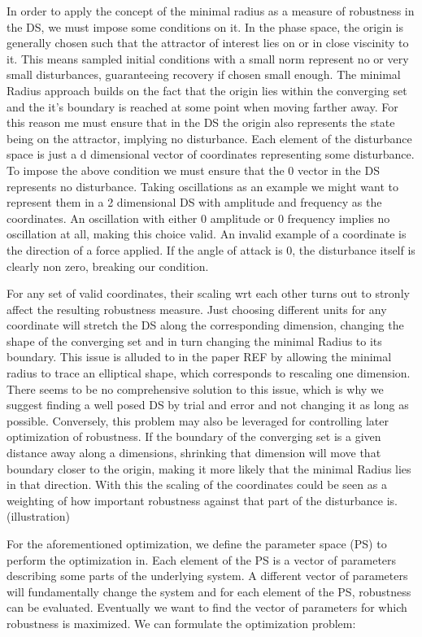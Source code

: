     In order to apply the concept of the minimal radius as a measure of robustness in the DS, we must impose some conditions on it.
    In the phase space, the origin is generally chosen such that the attractor of interest lies on or in close viscinity to it. This means sampled initial conditions with a small norm represent no or very small disturbances, guaranteeing recovery if chosen small enough. The minimal Radius approach builds on the fact that the origin lies within the converging set and the it's boundary is reached at some point when moving farther away. 
    For this reason me must ensure that in the DS the origin also represents the state being on the attractor, implying no disturbance.
    Each element of the disturbance space is just a d dimensional vector of coordinates representing some disturbance. To impose the above condition we must ensure that the 0 vector in the DS represents no disturbance. 
    Taking oscillations as an example we might want to represent them in a 2 dimensional DS with amplitude and frequency as the coordinates. An oscillation with either 0 amplitude or 0 frequency implies no oscillation at all, making this choice valid.
    An invalid example of a coordinate is the direction of a force applied. If the angle of attack is 0, the disturbance itself is clearly non zero, breaking our condition.
    
    For any set of valid coordinates, their scaling wrt each other turns out to stronly affect the resulting robustness measure. Just choosing different units for any coordinate will stretch the DS along the corresponding dimension, changing the shape of the converging set and in turn changing the minimal Radius to its boundary. This issue is alluded to in the paper REF by allowing the minimal radius to trace an elliptical shape, which corresponds to rescaling one dimension. There seems to be no comprehensive solution to this issue, which is why we suggest finding a well posed DS by trial and error and not changing it as long as possible. 
    Conversely, this problem may also be leveraged for controlling later optimization of robustness. If the boundary of the converging set is a given distance away along a dimensions, shrinking that dimension will move that boundary closer to the origin, making it more likely that the minimal Radius lies in that direction. With this the scaling of the coordinates could be seen as a weighting of how important robustness against that part of the disturbance is. 
    (illustration)

    For the aforementioned optimization, we define the parameter space (PS) to perform the optimization in. Each element of the PS is a vector of parameters describing some parts of the underlying system. A different vector of parameters will fundamentally change the system and for each element of the PS, robustness can be evaluated. Eventually we want to find the vector of parameters for which robustness is maximized. We can formulate the optimization problem:

